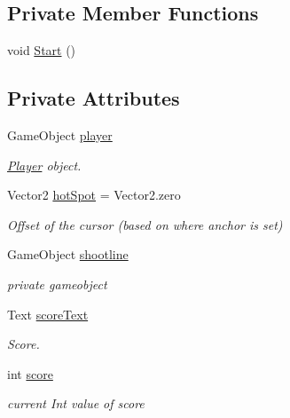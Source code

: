 \subsection*{Private Member Functions}
\begin{DoxyCompactItemize}
\item 
void \hyperlink{class_u_i_controller_a676b3b972c33885db4565ee43f23e459}{Start} ()
\end{DoxyCompactItemize}
\subsection*{Private Attributes}
\begin{DoxyCompactItemize}
\item 
\mbox{\label{class_u_i_controller_a98e6ab376e28858f95189dbdbda70620}} 
Game\+Object \hyperlink{class_u_i_controller_a98e6ab376e28858f95189dbdbda70620}{player}
\begin{DoxyCompactList}\small\item\em \hyperlink{class_player}{Player} object. \end{DoxyCompactList}\item 
\mbox{\label{class_u_i_controller_a2dabfeddc98455ff4a93d843ebb6c4d8}} 
Vector2 \hyperlink{class_u_i_controller_a2dabfeddc98455ff4a93d843ebb6c4d8}{hot\+Spot} = Vector2.\+zero
\begin{DoxyCompactList}\small\item\em Offset of the cursor (based on where anchor is set) \end{DoxyCompactList}\item 
\mbox{\label{class_u_i_controller_a5f32d4a4d789be31b0bd9609ff2307a2}} 
Game\+Object \hyperlink{class_u_i_controller_a5f32d4a4d789be31b0bd9609ff2307a2}{shootline}
\begin{DoxyCompactList}\small\item\em private gameobject \end{DoxyCompactList}\item 
\mbox{\label{class_u_i_controller_a9eb845eb67cb3403b17de6bd505a4379}} 
Text \hyperlink{class_u_i_controller_a9eb845eb67cb3403b17de6bd505a4379}{score\+Text}
\begin{DoxyCompactList}\small\item\em Score. \end{DoxyCompactList}\item 
\mbox{\label{class_u_i_controller_a8cca6d3f1aee858d74eef5bd8f1846d2}} 
int \hyperlink{class_u_i_controller_a8cca6d3f1aee858d74eef5bd8f1846d2}{score}
\begin{DoxyCompactList}\small\item\em current Int value of score \end{DoxyCompactList}\end{DoxyCompactItemize}


